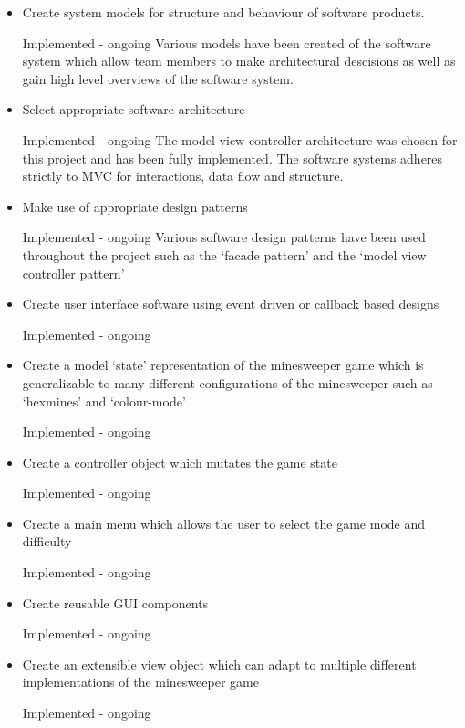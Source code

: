 \documentclass[12pt, a4]{report}
\begin{document}
\begin{itemize}
	\item Create system models for structure and behaviour of software products.
		\par \textcolor{codegreen}{Implemented - ongoing \textbar{} } Various models have been created of the software system which allow team members to make architectural descisions as well as gain high level overviews of the software system.
	\item Select appropriate software architecture
		\par \textcolor{codegreen}{Implemented - ongoing \textbar{} } The model view controller architecture was chosen for this project and has been fully implemented. The software systems adheres strictly to MVC for interactions, data flow and structure. 
	\item Make use of appropriate design patterns
		\par \textcolor{codegreen}{Implemented - ongoing \textbar{} } Various software design patterns have been used throughout the project such as the `facade pattern' and the `model view controller pattern'
	\item Create user interface software using event driven or callback based designs
		\par \textcolor{codegreen}{Implemented - ongoing \textbar{} } 
	\item Create a model `state' representation of the minesweeper game which is generalizable to many different configurations of the minesweeper such as `hexmines' and `colour-mode'
		\par \textcolor{codegreen}{Implemented - ongoing \textbar{} } 
	\item Create a controller object which mutates the game state
		\par \textcolor{codegreen}{Implemented - ongoing \textbar{} } 
	\item Create a main menu which allows the user to select the game mode and difficulty
		\par \textcolor{codegreen}{Implemented - ongoing \textbar{} } 
	\item Create reusable GUI components
		\par \textcolor{codegreen}{Implemented - ongoing \textbar{} } 
	\item Create an extensible view object which can adapt to multiple different implementations of the minesweeper game
		\par \textcolor{codegreen}{Implemented - ongoing \textbar{} } 



\end{itemize}
\end{document}
